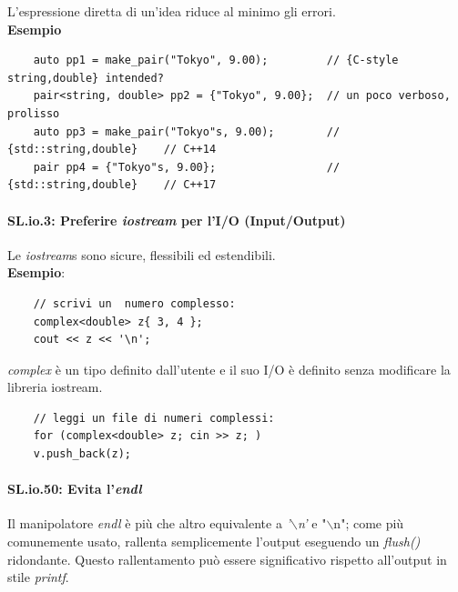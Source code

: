 \textsf{\small L'espressione diretta di un'idea riduce al minimo gli errori.} \\

\textsf{\small \textbf{Esempio}}

\begin{lstlisting}
	auto pp1 = make_pair("Tokyo", 9.00);         // {C-style string,double} intended?
	pair<string, double> pp2 = {"Tokyo", 9.00};  // un poco verboso, prolisso
	auto pp3 = make_pair("Tokyo"s, 9.00);        // {std::string,double}    // C++14
	pair pp4 = {"Tokyo"s, 9.00};                 // {std::string,double}    // C++17
\end{lstlisting}


\paragraph{SL.io.3: Preferire \emph{iostream} per l'I/O (Input/Output)}

\textsf{\small Le \emph{iostream}s sono sicure, flessibili ed estendibili.} \\

\textsf{\small \textbf{Esempio}: } \\

\begin{lstlisting}
	// scrivi un  numero complesso:
	complex<double> z{ 3, 4 };
	cout << z << '\n';
\end{lstlisting}

\textsf{\small \emph{complex} è un tipo definito dall'utente e il suo I/O è definito senza modificare la libreria iostream.} \\

\begin{lstlisting}
	// leggi un file di numeri complessi:
	for (complex<double> z; cin >> z; )
	v.push_back(z);
\end{lstlisting}

\paragraph{SL.io.50: Evita l'\emph{endl}}

\textsf{\small Il manipolatore \emph{endl} è più che altro equivalente a \emph{'$\backslash$n'} e "$\backslash$n"; come più comunemente usato, rallenta semplicemente l'output eseguendo un \emph{flush()} ridondante. Questo rallentamento può essere significativo rispetto all'output in stile \emph{printf}.} \\

